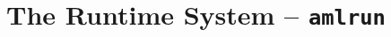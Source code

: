 
\chapter[The Runtime System -- amlrun]{The Runtime System -- \lstinline!amlrun!}
\label{ch:tools-amlrun}








